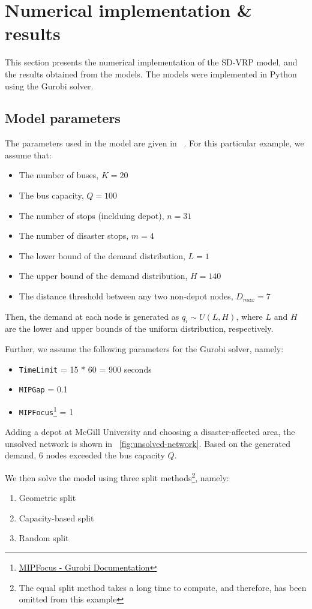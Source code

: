 \documentclass[12pt]{article}
\begin{document}
\newpage
\section{Numerical implementation \& results}
This section presents the numerical implementation of the SD-VRP model, and the results obtained from the models.
The models were implemented in Python using the Gurobi solver.

\subsection{Model parameters}
The parameters used in the model are given in ~. For this particular example, we assume that:
\begin{itemize}
    \item The number of buses, $K = 20$
    \item The bus capacity, $Q = 100$
    \item The number of stops (inclduing depot), $n = 31$
    \item The number of disaster stops, $m = 4$
    \item The lower bound of the demand distribution, $L = 1$
    \item The upper bound of the demand distribution, $H = 140$
    \item The distance threshold between any two non-depot nodes, $D_{max} = 7$
\end{itemize}

Then, the demand at each node is generated as $q_i \sim U(L, H)$, where $L$ and $H$ are the lower and upper bounds of the uniform distribution, respectively.

Further, we assume the following parameters for the Gurobi solver, namely:
\begin{itemize}
    \item \texttt{TimeLimit} = 15 * 60 = 900 seconds
    \item \texttt{MIPGap} = 0.1
    \item \texttt{MIPFocus}\footnote{\href{https://www.gurobi.com/documentation/current/refman/mipfocus.html}{MIPFocus - Gurobi Documentation}} = 1
\end{itemize}

Adding a depot at McGill University and choosing a disaster-affected area, the unsolved network is shown in ~\autoref{fig:unsolved-network}.
Based on the generated demand, 6 nodes exceeded the bus capacity $Q$.

We then solve the model using three split methods\footnote{The equal split method takes a long time to compute, and therefore, has been omitted from this example}, namely:
\begin{enumerate}
    \item Geometric split
    \item Capacity-based split
    \item Random split
\end{enumerate}
\end{document}
